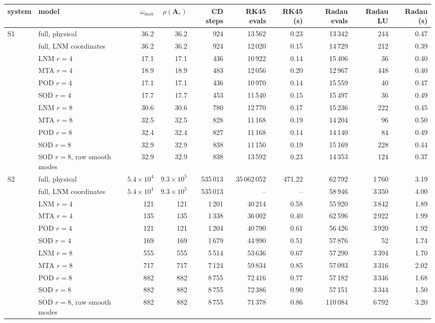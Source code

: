 \begin{tabular}{llrrrrrrrr}
\toprule
system & model & $\omega_{\max}$ & $\rho(\bm{A}_r)$ & CD steps & RK45 evals & RK45 (s) & Radau evals & Radau LU & Radau (s)\\
\midrule
S1 & full, physical & 36.2 & 36.2 & 924 & 13\,562 & 0.23 & 13\,342 & 244 & 0.47\\
 & full, LNM coordinates & 36.2 & 36.2 & 924 & 12\,020 & 0.15 & 14\,729 & 212 & 0.39\\
 & LNM $r=4$ & 17.1 & 17.1 & 436 & 10\,922 & 0.14 & 15\,406 & 36 & 0.40\\
 & MTA $r=4$ & 18.9 & 18.9 & 483 & 12\,056 & 0.20 & 12\,967 & 448 & 0.40\\
 & POD $r=4$ & 17.1 & 17.1 & 436 & 10\,970 & 0.14 & 15\,559 & 40 & 0.47\\
 & SOD $r=4$ & 17.7 & 17.7 & 453 & 11\,540 & 0.15 & 15\,497 & 36 & 0.49\\
 & LNM $r=8$ & 30.6 & 30.6 & 780 & 12\,770 & 0.17 & 15\,236 & 222 & 0.45\\
 & MTA $r=8$ & 32.5 & 32.5 & 828 & 11\,168 & 0.19 & 14\,204 & 96 & 0.50\\
 & POD $r=8$ & 32.4 & 32.4 & 827 & 11\,168 & 0.14 & 14\,140 & 84 & 0.49\\
 & SOD $r=8$ & 32.9 & 32.9 & 838 & 11\,150 & 0.19 & 15\,169 & 228 & 0.44\\
 & SOD $r=8$, raw smooth modes & 32.9 & 32.9 & 838 & 13\,592 & 0.23 & 14\,353 & 124 & 0.37\\
\midrule
S2 & full, physical & $5.4\times10^{4}$ & $9.3\times10^{5}$ & 535\,013 & 35\,062\,052 & 471.22 & 62\,792 & 1\,760 & 3.19\\
 & full, LNM coordinates & $5.4\times10^{4}$ & $9.3\times10^{5}$ & 535\,013 & -- & -- & 58\,946 & 3\,350 & 4.00\\
 & LNM $r=4$ & 121 & 121 & 1\,201 & 40\,214 & 0.58 & 55\,920 & 3\,842 & 1.89\\
 & MTA $r=4$ & 135 & 135 & 1\,338 & 36\,002 & 0.40 & 62\,596 & 2\,922 & 1.99\\
 & POD $r=4$ & 121 & 121 & 1\,204 & 40\,790 & 0.61 & 56\,426 & 3\,920 & 1.92\\
 & SOD $r=4$ & 169 & 169 & 1\,679 & 44\,990 & 0.51 & 57\,876 & 52 & 1.74\\
 & LNM $r=8$ & 555 & 555 & 5\,514 & 53\,636 & 0.67 & 57\,290 & 3\,394 & 1.70\\
 & MTA $r=8$ & 717 & 717 & 7\,124 & 59\,834 & 0.85 & 57\,093 & 3\,316 & 2.02\\
 & POD $r=8$ & 882 & 882 & 8\,755 & 72\,416 & 0.77 & 57\,182 & 3\,346 & 1.68\\
 & SOD $r=8$ & 882 & 882 & 8\,755 & 72\,386 & 0.90 & 57\,151 & 3\,344 & 1.50\\
 & SOD $r=8$, raw smooth modes & 882 & 882 & 8\,755 & 71\,378 & 0.86 & 110\,084 & 6\,792 & 3.20\\
\bottomrule
\end{tabular}
